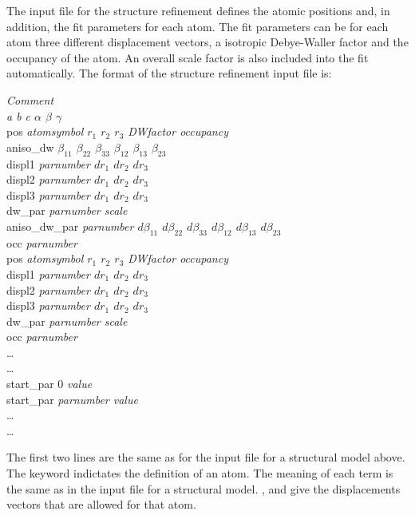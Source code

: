 \documentclass[a4paper]{article}
\begin{document}
The input file for the structure refinement defines the atomic positions and, in addition, the fit parameters for each atom. 
The fit parameters can be for each atom three different displacement vectors, a isotropic Debye-Waller factor and the occupancy of the atom.
An overall scale factor is also included into the fit automatically.
The format of the structure refinement input file is:
\begin{filestruc}
{\em Comment \\
a b c $\alpha$ $\beta$ $\gamma$ }\\
pos {\em atomsymbol $r_1$ $r_2$ $r_3$ DWfactor occupancy }\\
aniso\_dw {\em $\beta_{11}$ $\beta_{22}$ $\beta_{33}$ $\beta_{12}$
 $\beta_{13}$ $\beta_{23}$} \\
displ1 {\em parnumber $dr_1$ $dr_2$ $dr_3$} \\
displ2 {\em parnumber $dr_1$ $dr_2$ $dr_3$} \\
displ3 {\em parnumber $dr_1$ $dr_2$ $dr_3$} \\
dw\_par {\em parnumber scale} \\
aniso\_dw\_par {\em parnumber $d\beta_{11}$ $d\beta_{22}$ $d\beta_{33}$
 $d\beta_{12}$ $d\beta_{13}$ $d\beta_{23}$} \\
occ {\em parnumber} \\
pos {\em atomsymbol $r_1$ $r_2$ $r_3$ DWfactor occupancy }\\
displ1 {\em parnumber $dr_1$ $dr_2$ $dr_3$} \\
displ2 {\em parnumber $dr_1$ $dr_2$ $dr_3$} \\
displ3 {\em parnumber $dr_1$ $dr_2$ $dr_3$} \\
dw\_par {\em parnumber scale} \\
occ {\em parnumber} \\
\ldots \\
\ldots \\
start\_par  0 {\em value} \\
start\_par {\em parnumber value} \\
\ldots \\
\ldots \\
\end{filestruc}
The first two lines are the same as for the input file for a structural model above.
The  keyword indictates the definition of an atom. The meaning of each term is the same as in the input file for a structural model.
,  and  give the displacements vectors that are allowed for that atom.
\end{document}
